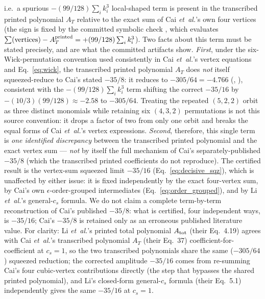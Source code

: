 \documentclass[aps,prd,twocolumn,superscriptaddress,showpacs,preprintnumbers,nofootinbib,longbibliography,floatfix]{revtex4-2}
\newcommand{\etal}{\textit{et~al.}}
\begin{document}
i.e.\ a spurious $-(99/128)\sum_i k_i^3$ local-shaped term is present in the transcribed printed polynomial $A_T$ relative to the exact sum of Cai \etal's own four vertices (the sign is fixed by the committed symbolic check , which evaluates $\sum(\text{vertices})-A_T^{\rm printed}=+(99/128)\sum_i k_i^3$). Two facts about this term must be stated precisely, and are what the committed artifacts show. \emph{First}, under the six-Wick-permutation convention used consistently in Cai \etal's vertex equations and Eq.~\eqref{eq:wick}, the transcribed printed polynomial $A_T$ does \emph{not} itself squeezed-reduce to Cai's stated $-35/8$: it reduces to $-305/64=-4.766$ (, ), consistent with the $-(99/128)\sum_i k_i^3$ term shifting the correct $-35/16$ by $-(10/3)(99/128)\approx-2.58$ to $-305/64$. Treating the repeated $(5,2,2)$ orbit as three distinct monomials while retaining six $(4,3,2)$ permutations is not this source convention: it drops a factor of two from only one orbit and breaks the equal forms of Cai \etal's vertex expressions. \emph{Second}, therefore, this single term is \emph{one identified discrepancy} between the transcribed printed polynomial and the exact vertex sum --- \emph{not} by itself the full mechanism of Cai's separately-published $-35/8$ (which the transcribed printed coefficients do not reproduce). The certified result is the vertex-sum squeezed limit $-35/16$ (Eq.~\ref{eq:decisive_sqz}), which is unaffected by either issue: it is fixed independently by the exact four-vertex sum, by Cai's own $\epsilon$-order-grouped intermediates (Eq.~\ref{eq:order_grouped}), and by Li \etal's general-$c_s$ formula. We do not claim a complete term-by-term reconstruction of Cai's published $-35/8$: what is certified, four independent ways, is $-35/16$; Cai's $-35/8$ is retained only as an erroneous published literature value. For clarity: Li \etal's printed total polynomial $A_{\rm tot}$ (their Eq.~4.19) agrees with Cai \etal's transcribed polynomial $A_T$ (their Eq.~37) coefficient-for-coefficient at $c_s=1$, so the two transcribed polynomials share the same ($-305/64$) squeezed reduction; the corrected amplitude $-35/16$ comes from re-summing Cai's four cubic-vertex contributions directly (the step that bypasses the shared printed polynomial), and Li's closed-form general-$c_s$ formula (their Eq.~5.1) independently gives the same $-35/16$ at $c_s=1$.
\end{document}
